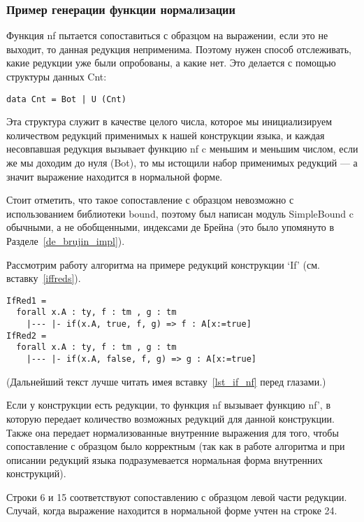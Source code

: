\pagebreak
\subsubsection{Пример генерации функции нормализации}

Функция nf пытается сопоставиться с образцом на выражении, если это не выходит, то данная редукция неприменима. Поэтому нужен способ отслеживать, какие редукции уже были опробованы, а какие нет. Это делается с помощью структуры данных Cnt:

\begin{lstlisting}
data Cnt = Bot | U (Cnt)
\end{lstlisting}

Эта структура служит в качестве целого числа, которое мы инициализируем количеством редукций применимых к нашей конструкции языка, и каждая несовпавшая редукция вызывает функцию nf c меньшим и меньшим числом, если же мы доходим до нуля (Bot), то мы истощили набор применимых редукций --- а значит выражение находится в нормальной форме.

Стоит отметить, что такое сопоставление с образцом невозможно с использованием библиотеки bound\cite{bound}, поэтому был написан модуль SimpleBound c обычными, а не обобщенными, индексами де Брейна (это было упомянуто в Разделе~\ref{de_brujin_impl}).

Рассмотрим работу алгоритма на примере редукций конструкции `If' (см. вставку~\ref{iffreds}).

\begin{lstlisting}[label={iffreds}, caption={Правила редукций для конструкции If},captionpos=b, frame=single, float, floatplacement=H]
IfRed1 =
  forall x.A : ty, f : tm , g : tm
    |--- |- if(x.A, true, f, g) => f : A[x:=true]
IfRed2 =
  forall x.A : ty, f : tm , g : tm
    |--- |- if(x.A, false, f, g) => g : A[x:=true]
\end{lstlisting}

(Дальнейший текст лучше читать имея вставку~\ref{lst_if_nf} перед глазами.)

Если у конструкции есть редукции, то функция nf вызывает функцию nf', в которую передает количество возможных редукций для данной конструкции. Также она передает нормализованные внутренние выражения для того, чтобы сопоставление с образцом было корректным (так как в работе алгоритма и при описании редукций языка подразумевается нормальная форма внутренних конструкций).

Строки 6 и 15 соответствуют сопоставлению с образцом левой части редукции. Случай, когда выражение находится в нормальной форме учтен на строке 24.

